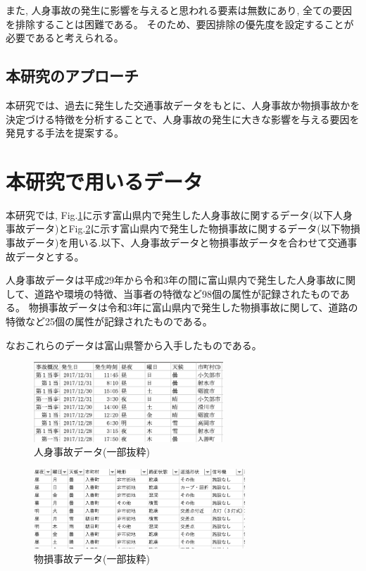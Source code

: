 \documentclass[a4j,8.5pt, twocolumn,fleqn]{jbook}
\begin{document}
また, 人身事故の発生に影響を与えると思われる要素は無数にあり, 全ての要因を排除することは困難である。
そのため、要因排除の優先度を設定することが必要であると考えられる。

\subsection{本研究のアプローチ}
本研究では、過去に発生した交通事故データをもとに、人身事故か物損事故かを決定づける特徴を分析することで、人身事故の発生に大きな影響を与える要因を発見する手法を提案する。



\section{本研究で用いるデータ}
本研究では, Fig.\ref{人身事故データ}に示す富山県内で発生した人身事故に関するデータ(以下人身事故データ)とFig.\ref{物損事故データ}に示す富山県内で発生した物損事故に関するデータ(以下物損事故データ)を用いる.以下、人身事故データと物損事故データを合わせて交通事故データとする。

人身事故データは平成29年から令和3年の間に富山県内で発生した人身事故に関して、道路や環境の特徴、当事者の特徴など98個の属性が記録されたものである。
物損事故データは令和3年に富山県内で発生した物損事故に関して、道路の特徴など25個の属性が記録されたものである。

なおこれらのデータは富山県警から入手したものである。

\begin{figure}[htb]
    \centering
    \includegraphics[height=30mm]{images/jinshixn.png}
    \caption{人身事故データ(一部抜粋)}
    \label{人身事故データ}
\end{figure}

\begin{figure}[htb]
    \centering
    \includegraphics[height=30mm]{images/bussoxn.png}
    \vspace{-3mm}
    \caption{物損事故データ(一部抜粋)}
    \label{物損事故データ}
\end{figure}
\end{document}

